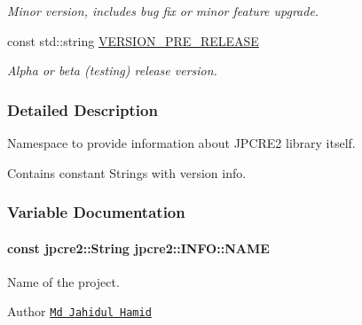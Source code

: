 \begin{DoxyCompactItemize}
\begin{DoxyCompactList}\small\item\em Minor version, includes bug fix or minor feature upgrade. \end{DoxyCompactList}\item 
const std\+::string \hyperlink{namespacejpcre2_1_1INFO_a85fb46b46141271d426f53b2c2ba6b15}{V\+E\+R\+S\+I\+O\+N\+\_\+\+P\+R\+E\+\_\+\+R\+E\+L\+E\+A\+SE}\hypertarget{namespacejpcre2_1_1INFO_a85fb46b46141271d426f53b2c2ba6b15}{}\label{namespacejpcre2_1_1INFO_a85fb46b46141271d426f53b2c2ba6b15}

\begin{DoxyCompactList}\small\item\em Alpha or beta (testing) release version. \end{DoxyCompactList}\end{DoxyCompactItemize}


\subsubsection{Detailed Description}
Namespace to provide information about J\+P\+C\+R\+E2 library itself. 

Contains constant Strings with version info. 

\subsubsection{Variable Documentation}
\paragraph[{\texorpdfstring{N\+A\+ME}{NAME}}]{\setlength{\rightskip}{0pt plus 5cm}const {\bf jpcre2\+::\+String} jpcre2\+::\+I\+N\+F\+O\+::\+N\+A\+ME}\hypertarget{namespacejpcre2_1_1INFO_a0d5716a82b496f2ccf5eee832275b4b8}{}\label{namespacejpcre2_1_1INFO_a0d5716a82b496f2ccf5eee832275b4b8}


Name of the project. 

\begin{DoxyAuthor}{Author}
\href{https://github.com/neurobin}{\tt Md Jahidul Hamid} 
\end{DoxyAuthor}

